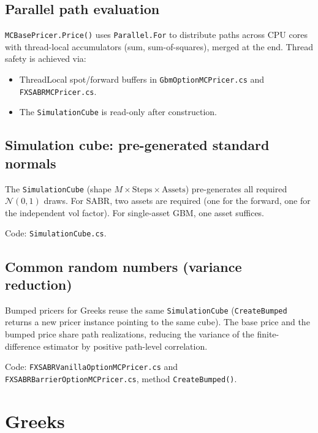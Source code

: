 \documentclass[11pt,a4paper]{article}
\newcommand{\N}{\mathcal{N}}
\newcommand{\coderef}[1]{\texttt{\color{blue!60!black}#1}}
\theoremstyle{definition}
\begin{document}
\subsection{Parallel path evaluation}

\coderef{MCBasePricer.Price()} uses \texttt{Parallel.For} to distribute
paths across CPU cores with thread-local accumulators (sum, sum-of-squares),
merged at the end.  Thread safety is achieved via:
\begin{itemize}[nosep]
  \item ThreadLocal spot/forward buffers in \coderef{GbmOptionMCPricer.cs}
    and \coderef{FXSABRMCPricer.cs}.
  \item The \texttt{SimulationCube} is read-only after construction.
\end{itemize}

\subsection{Simulation cube: pre-generated standard normals}

The \texttt{SimulationCube} (shape $M\times\text{Steps}\times\text{Assets}$)
pre-generates all required $\N(0,1)$ draws.  For SABR, two assets are
required (one for the forward, one for the independent vol factor).  For
single-asset GBM, one asset suffices.

Code: \coderef{SimulationCube.cs}.

\subsection{Common random numbers (variance reduction)}

Bumped pricers for Greeks reuse the same \texttt{SimulationCube}
(\texttt{CreateBumped} returns a new pricer instance pointing to the same
cube).  The base price and the bumped price share path realizations, reducing
the variance of the finite-difference estimator by positive path-level
correlation.

Code: \coderef{FXSABRVanillaOptionMCPricer.cs} and
\coderef{FXSABRBarrierOptionMCPricer.cs}, method \texttt{CreateBumped()}.

\section{Greeks}
\label{sec:greeks}
\end{document}
